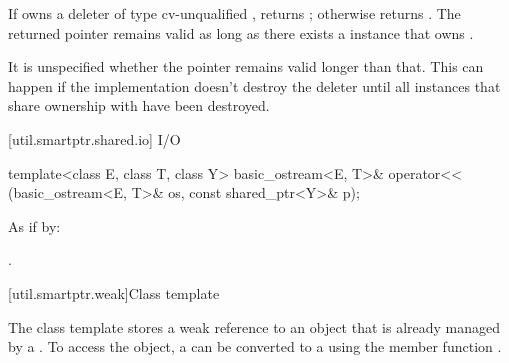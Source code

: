 \begin{itemdescr}
\pnum\returns  If  owns a deleter  of type cv-unqualified
, returns ; otherwise returns .
The returned
pointer remains valid as long as there exists a  instance
that owns . \begin{note} It is unspecified whether the pointer
remains valid longer than that. This can happen if the implementation doesn't destroy
the deleter until all  instances that share ownership with
 have been destroyed. \end{note}
\end{itemdescr}

[util.smartptr.shared.io]{ I/O}

%
\begin{itemdecl}
template<class E, class T, class Y>
  basic_ostream<E, T>& operator<< (basic_ostream<E, T>& os, const shared_ptr<Y>& p);
\end{itemdecl}

\begin{itemdescr}
\pnum\effects As if by: 

\pnum\returns  {}.
\end{itemdescr}

[util.smartptr.weak]{Class template }

\pnum
{}%
The  class template stores a weak reference to an object
that is already managed by a . To access the object, a
 can be converted to a  using the member
function .

